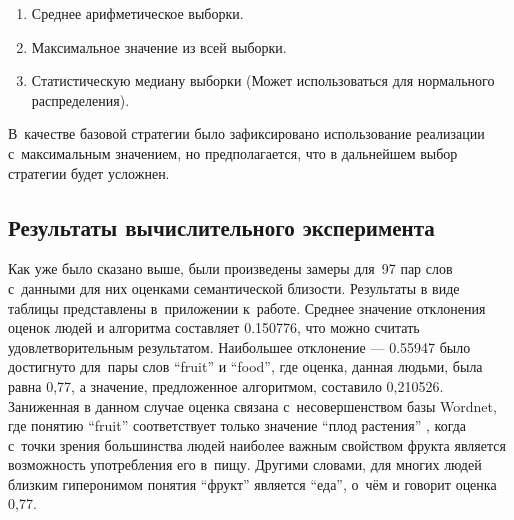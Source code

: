 \begin{enumerate}

\item{Среднее арифметическое выборки.}
\item{Максимальное значение из всей выборки.}
\item{Статистическую медиану выборки (Может использоваться для нормального распределения).}

\end{enumerate}

В~качестве базовой стратегии было зафиксировано использование реализации с~максимальным значением,
но предполагается, что в дальнейшем выбор стратегии будет усложнен.

\subsection{Результаты вычислительного эксперимента}

Как уже было сказано выше, были произведены замеры для~97 пар слов с~данными для них оценками семантической близости. 
Результаты в виде таблицы представлены в~приложении к~работе.
Среднее значение отклонения оценок людей и алгоритма составляет 0.150776,
что можно считать удовлетворительным результатом.
Наибольшее отклонение --- 0.55947 было достигнуто для~пары слов
``fruit'' и ``food'',
где оценка, данная людьми, была равна 0,77, 
а значение, предложенное алгоритмом, составило 0,210526. 
Заниженная в данном случае оценка связана с~несовершенством базы Wordnet, 
где понятию ``fruit'' соответствует только значение ``плод растения'' ,
когда с~точки зрения большинства людей наиболее важным свойством фрукта является возможность употребления его в~пищу. 
Другими словами, для многих людей близким гиперонимом понятия ``фрукт'' является ``еда'', 
о~чём и говорит оценка 0,77.
